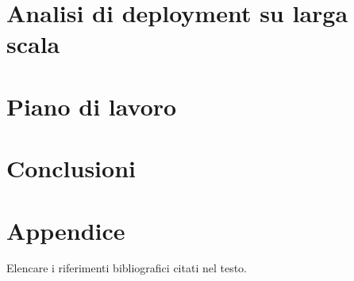 \documentclass[12pt]{article}
\begin{document}

\section{Analisi di deployment su larga scala}



\newpage



\section{Piano di lavoro}



\newpage



\section{Conclusioni}



\newpage



\appendix
{}
\section*{Appendice}



\newpage


\begin{thebibliography}
    Elencare i riferimenti bibliografici citati nel testo.
\end{thebibliography}

\end{document}
